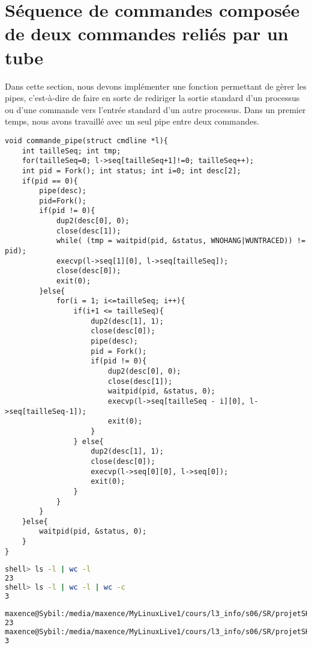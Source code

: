 \documentclass{report}
\begin{document}
		\section{S\'equence de commandes compos\'ee de deux commandes reli\'es par un tube}
			Dans cette section, nous devons impl\'ementer une fonction permettant de g\`erer les pipes, c'est-\`a-dire de faire en sorte de rediriger la sortie standard d'un processus ou d'une commande vers l'entr\'ee standard d'un autre processus. Dans un premier temps, nous avons travaill\'e avec un seul pipe entre deux commandes. \\
			\begin{lstlisting}
void commande_pipe(struct cmdline *l){
	int tailleSeq; int tmp;
	for(tailleSeq=0; l->seq[tailleSeq+1]!=0; tailleSeq++);
	int pid = Fork(); int status; int i=0; int desc[2];
	if(pid == 0){
		pipe(desc);
		pid=Fork();
		if(pid != 0){
			dup2(desc[0], 0);
			close(desc[1]);
			while( (tmp = waitpid(pid, &status, WNOHANG|WUNTRACED)) != pid);
			execvp(l->seq[1][0], l->seq[tailleSeq]);
			close(desc[0]);
			exit(0);
		}else{
			for(i = 1; i<=tailleSeq; i++){
				if(i+1 <= tailleSeq){
					dup2(desc[1], 1);
					close(desc[0]);
					pipe(desc);
					pid = Fork();
					if(pid != 0){
						dup2(desc[0], 0);
						close(desc[1]);
						waitpid(pid, &status, 0);
						execvp(l->seq[tailleSeq - i][0], l->seq[tailleSeq-1]);
						exit(0);
					}
				} else{
					dup2(desc[1], 1);
					close(desc[0]);
					execvp(l->seq[0][0], l->seq[0]);
					exit(0);
				}
			}		
		}
	}else{
		waitpid(pid, &status, 0);
	}
}
			\end{lstlisting}
			\begin{lstlisting}[frame=single,basicstyle=\footnotesize,language=bash]
shell> ls -l | wc -l
23
shell> ls -l | wc -l | wc -c
3
			\end{lstlisting}
			\begin{lstlisting}[frame=single,basicstyle=\footnotesize,language=bash]
maxence@Sybil:/media/maxence/MyLinuxLive1/cours/l3_info/s06/SR/projetSHELL$ ls -l | wc -l
23
maxence@Sybil:/media/maxence/MyLinuxLive1/cours/l3_info/s06/SR/projetSHELL$ ls -l | wc -l | wc -c
3
			\end{lstlisting}
\end{document}
